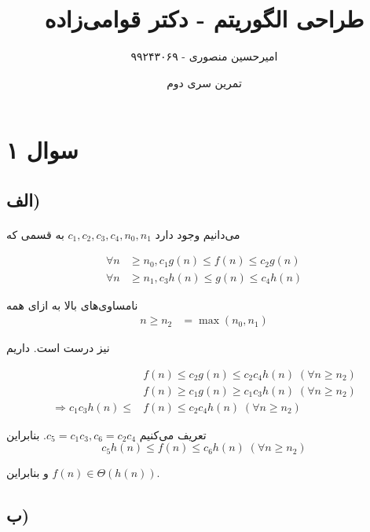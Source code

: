 \documentclass{article}
\title{طراحی الگوریتم - دکتر قوامی‌زاده}
\author{امیرحسین منصوری - ۹۹۲۴۳۰۶۹}
\date{تمرین سری دوم}
\begin{document}
	\maketitle

	\section*{سوال ۱}
	\subsection*{الف)}
	\paragraph*{}

	می‌دانیم وجود دارد
	$c_1, c_2, c_3, c_4, n_0, n_1$
	به قسمی که

	\begin{align*}
		\forall n &\ge n_0, c_1g(n) \le f(n) \le c_2g(n) \\
		\forall n &\ge n_1, c_3h(n) \le g(n) \le c_4h(n)
	\end{align*}

	نامساوی‌های بالا به ازای همه
	\begin{align*}
		n \ge n_2 &= \max(n_0, n_1)
	\end{align*}

	نیز درست است. داریم

	\begin{align*}
		&f(n) \le c_2g(n) \le c_2c_4h(n) \; (\forall n \ge n_2) \\
		&f(n) \ge c_1g(n) \ge c_1c_3h(n) \; (\forall n \ge n_2) \\
		\Rightarrow
		c_1c_3h(n) \le &f(n) \le c_2c_4h(n) \; (\forall n \ge n_2)
	\end{align*}

	تعریف می‌کنیم
	$c_5 = c_1c_3, c_6 = c_2c_4$.
	بنابراین
	\begin{equation*}
		c_5h(n) \le f(n) \le c_6h(n) \; (\forall n \ge n_2)
	\end{equation*}

	و بنابراین
	$f(n) \in \Theta(h(n))$.

	\subsection*{ب)}
	\paragraph*{}
\end{document}
